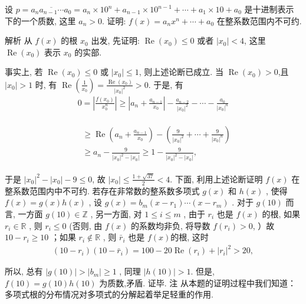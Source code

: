 \begin{example}
	设 $p=\overline{a_n a_{n-1} \cdots a_0}=a_n \times 10^n+a_{n-1} \times 10^{n-1}+\cdots+a_1 \times 10+a_0$ 是十进制表示下的一个质数, 这里 $a_n>0$. 证明: $f(x)=a_n x^n+\cdots+a_0$ 在整系数范围内不可约.
\end{example}
\begin{solution}
	解析 从 $f(x)$ 的根 $x_0$ 出发, 先证明: $\operatorname{Re}\left(x_0\right) \leqslant 0$ 或者 $\left|x_0\right|<4$, 这里 $\operatorname{Re}\left(x_0\right)$ 表示 $x_0$ 的实部.

	事实上, 若 $\operatorname{Re}\left(x_0\right) \leqslant 0$ 或 $\left|x_0\right| \leqslant 1$, 则上述论断已成立. 当 $\operatorname{Re}\left(x_0\right)>0$,且 $\left|x_0\right|>1$ 时, 有 $\operatorname{Re}\left(\frac{1}{x_0}\right)=\frac{\operatorname{Re}\left(x_0\right)}{\left|x_0\right|^2}>0$. 于是, 有
	\begin{align*}
		0=\left|\frac{f\left(x_0\right)}{x_0^n}\right| \geqslant\left|a_n+\frac{a_{n-1}}{x_0}\right|-\frac{a_{n-2}}{\left|x_0\right|^2}-\cdots-\frac{a_0}{\left|x_0\right|^n}
	\end{align*}

	\begin{align*}
		\begin{aligned}
			 & \geqslant \operatorname{Re}\left(a_n+\frac{a_{n-1}}{x_0}\right)-\left(\frac{9}{\left|x_0\right|^2}+\cdots+\frac{9}{\left|x_0\right|^n}\right) \\
			 & \geqslant a_n-\frac{9}{\left|x_0\right|^2-\left|x_0\right|} \geqslant 1-\frac{9}{\left|x_0\right|^2-\left|x_0\right|},
		\end{aligned}
	\end{align*}

	于是 $\left|x_0\right|^2-\left|x_0\right|-9 \leqslant 0$, 故 $\left|x_0\right| \leqslant \frac{1+\sqrt{37}}{2}<4$.
	下面, 利用上述论断证明 $f(x)$ 在整系数范围内中不可约.
	若存在非常数的整系数多项式 $g(x)$ 和 $h(x)$ , 使得 $f(x)=g(x) h(x)$ , 设 $g(x)=b_m\left(x-r_1\right) \cdots\left(x-r_m\right)$ . 对于 $g(10)$ 而言, 一方面 $g(10) \in \mathbb{Z}$ , 另一方面, 对 $1 \leqslant i \leqslant m$ , 由于 $r_i$ 也是 $f(x)$ 的根, 如果 $r_i \in \mathbb{R}$ , 则 $r_i \leqslant 0$ (否则, 由 $f(x)$ 的系数均非负, 将导数 $f\left(r_i\right)>0$, ）故 $10-r_i \geqslant 10$ ；如果 $r_i \notin \mathbb{R}$ , 则 $\bar{r}_i$ 也是 $f(x)$的根, 这时
	\begin{align*}
		\left(10-r_i\right)\left(10-\bar{r}_i\right)=100-20 \operatorname{Re}\left(r_i\right)+\left|r_i\right|^2>20,
	\end{align*}

	所以, 总有 $|g(10)|>\left|b_m\right| \geqslant 1$ , 同理 $|h(10)|>1$.
	但是, $f(10)=g(10) h(10)$ 为质数,矛盾. 证毕.
	注 从本题的证明过程中我们知道：多项式根的分布情况对多项式的分解起着举足轻重的作用.
\end{solution}

